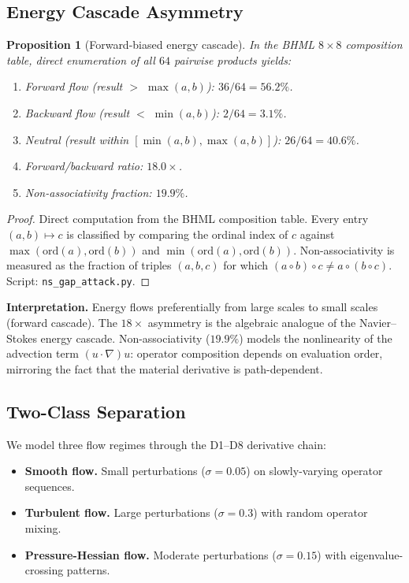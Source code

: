 \documentclass[11pt]{article}
\newtheorem{proposition}[theorem]{Proposition}
\theoremstyle{definition}
\theoremstyle{remark}
\begin{document}
\subsection{Energy Cascade Asymmetry}
\label{ssec:ph3-cascade}

\begin{proposition}[Forward-biased energy cascade]
\label{prop:cascade}
In the BHML $8\times 8$ composition table, direct enumeration of all $64$
pairwise products yields:
\begin{enumerate}
  \item Forward flow (result $>$ $\max(a,b)$): $36/64 = 56.2\%$.
  \item Backward flow (result $<$ $\min(a,b)$): $2/64 = 3.1\%$.
  \item Neutral (result within $[\min(a,b),\max(a,b)]$): $26/64 = 40.6\%$.
  \item Forward/backward ratio: $18.0\times$.
  \item Non-associativity fraction: $19.9\%$.
\end{enumerate}
\end{proposition}

\begin{proof}
Direct computation from the BHML composition table.  Every entry
$(a,b)\mapsto c$ is classified by comparing the ordinal index of $c$ against
$\max(\mathrm{ord}(a),\mathrm{ord}(b))$ and
$\min(\mathrm{ord}(a),\mathrm{ord}(b))$.  Non-associativity is measured as
the fraction of triples $(a,b,c)$ for which $(a\circ b)\circ c \neq a\circ
(b\circ c)$.  Script: \texttt{ns\_gap\_attack.py}.
\end{proof}

\noindent\textbf{Interpretation.}
Energy flows preferentially from large scales to small scales (forward
cascade).  The $18\times$ asymmetry is the algebraic analogue of the
Navier--Stokes energy cascade.  Non-associativity ($19.9\%$) models the
nonlinearity of the advection term $(u\cdot\nabla)u$: operator composition
depends on evaluation order, mirroring the fact that the material derivative
is path-dependent.

\subsection{Two-Class Separation}
\label{ssec:ph3-separation}

We model three flow regimes through the D1--D8 derivative chain:
\begin{itemize}
  \item \textbf{Smooth flow.}  Small perturbations ($\sigma=0.05$) on
        slowly-varying operator sequences.
  \item \textbf{Turbulent flow.}  Large perturbations ($\sigma=0.3$) with
        random operator mixing.
  \item \textbf{Pressure-Hessian flow.}  Moderate perturbations
        ($\sigma=0.15$) with eigenvalue-crossing patterns.
\end{itemize}
\end{document}
